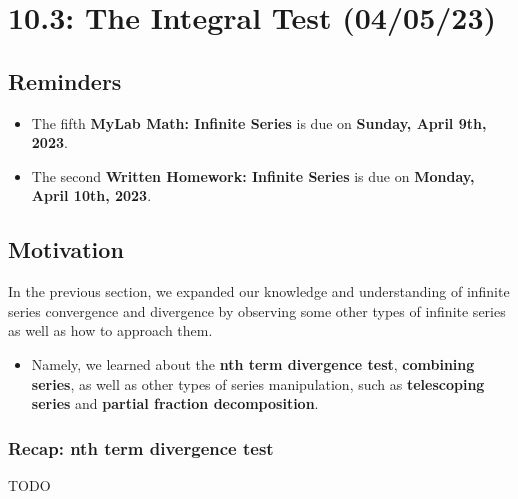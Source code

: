 \documentclass{report}
\begin{document}
\begin{sloppypar}
\begin{center}
\end{center}


\chapter{10.3: The Integral Test (04/05/23)}
\section{Reminders}
\begin{itemize}
  \item The fifth \textbf{MyLab Math: Infinite Series} is due on
        \textbf{Sunday, April 9th, 2023}.
  \item The second \textbf{Written Homework: Infinite Series} is due on
        \textbf{Monday, April 10th, 2023}.
\end{itemize}

\section{Motivation}
In the previous section, we expanded our knowledge and understanding
of infinite series convergence and divergence by observing some
other types of infinite series as well as how to approach them.
\begin{itemize}
  \item Namely, we learned about the \textbf{nth term divergence test},
        \textbf{combining series}, as well as other types of series
        manipulation, such as \textbf{telescoping series} and
        \textbf{partial fraction decomposition}.

\end{itemize}

\subsection{Recap: nth term divergence test}
TODO

\end{sloppypar}
\end{document}
